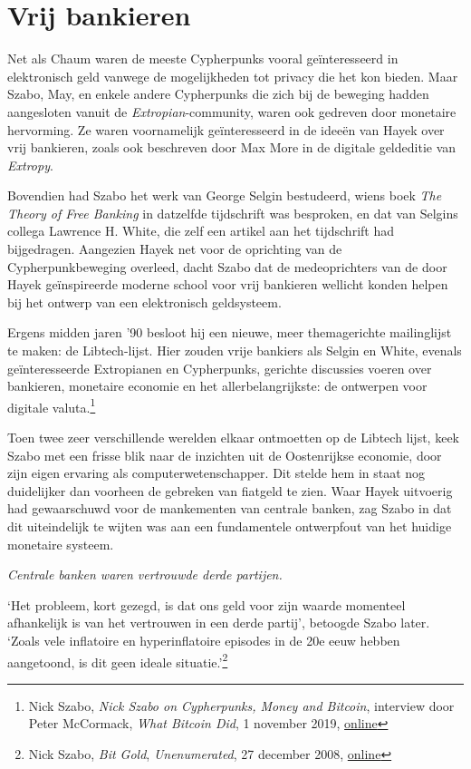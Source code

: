 \documentclass[
  a5paper,
  smalldemyvopaper,11pt,twoside,onecolumn,openright,extrafontsizes,
hidelinks]{memoir}
\begin{document}
\section{Vrij bankieren}\label{vrij-bankieren}

Net als Chaum waren de meeste Cypherpunks vooral geïnteresseerd in
elektronisch geld vanwege de mogelijkheden tot privacy die het kon
bieden. Maar Szabo, May, en enkele andere Cypherpunks die zich bij de
beweging hadden aangesloten vanuit de \emph{Extropian}-community, waren
ook gedreven door monetaire hervorming. Ze waren voornamelijk
geïnteresseerd in de ideeën van Hayek over vrij bankieren, zoals ook
beschreven door Max More in de digitale geldeditie van \emph{Extropy}.

Bovendien had Szabo het werk van George Selgin bestudeerd, wiens boek
\emph{The Theory of Free Banking} in datzelfde tijdschrift was
besproken, en dat van Selgins collega Lawrence H. White, die zelf een
artikel aan het tijdschrift had bijgedragen. Aangezien Hayek net voor de
oprichting van de Cypherpunkbeweging overleed, dacht Szabo dat de
medeoprichters van de door Hayek geïnspireerde moderne school voor vrij
bankieren wellicht konden helpen bij het ontwerp van een elektronisch
geldsysteem.

Ergens midden jaren '90 besloot hij een nieuwe, meer themagerichte
mailinglijst te maken: de Libtech-lijst. Hier zouden vrije bankiers als
Selgin en White, evenals geïnteresseerde Extropianen en Cypherpunks,
gerichte discussies voeren over bankieren, monetaire economie en het
allerbelangrijkste: de ontwerpen voor digitale valuta.\footnote{Nick
  Szabo, \emph{Nick Szabo on Cypherpunks, Money and Bitcoin}, interview
  door Peter McCormack, \emph{What Bitcoin Did}, 1 november 2019,
  \href{https://www.whatbitcoindid.com/podcast/nick-szabo-on-cypherpunks-money-and-bitcoin}{online}}

Toen twee zeer verschillende werelden elkaar ontmoetten op de Libtech
lijst, keek Szabo met een frisse blik naar de inzichten uit de
Oostenrijkse economie, door zijn eigen ervaring als
computerwetenschapper. Dit stelde hem in staat nog duidelijker dan
voorheen de gebreken van fiatgeld te zien. Waar Hayek uitvoerig had
gewaarschuwd voor de mankementen van centrale banken, zag Szabo in dat
dit uiteindelijk te wijten was aan een fundamentele ontwerpfout van het
huidige monetaire systeem.

\emph{Centrale banken waren vertrouwde derde partijen.}

`Het probleem, kort gezegd, is dat ons geld voor zijn waarde momenteel
afhankelijk is van het vertrouwen in een derde partij', betoogde Szabo
later. `Zoals vele inflatoire en hyperinflatoire episodes in de 20e eeuw
hebben aangetoond, is dit geen ideale situatie.'\footnote{Nick Szabo,
  \emph{Bit Gold}, \emph{Unenumerated}, 27 december 2008,
  \href{https://unenumerated.blogspot.com/2005/12/bit-gold.html}{online}}
\end{document}
